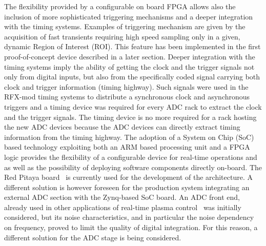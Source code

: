 The flexibility provided by a configurable on board FPGA allows also the inclusion of more sophisticated triggering mechanisms and a deeper integration with the timing systems. Examples of triggering mechanism are given by the acquisition of fast transients requiring high speed sampling only in a given, dynamic Region of Interest (ROI). This feature has been implemented in the first proof-of-concept device described in a later section. Deeper integration with the timing systems imply the ability of getting the clock and the trigger signals not only from digital inputs, but also from the specifically coded signal carrying both clock and trigger information (timing highway)\cite{dio4}. Such signals were used in the RFX-mod timing systems to distribute a synchronous clock and asynchronous triggers and a timing device was required for every ADC rack to extract the clock and the trigger signals. The timing device is no more required for a rack hosting the new ADC devices because the ADC devices can directly extract timing information from the timing highway.  
%
The adoption of a System on Chip (SoC) based technology exploiting both an ARM based processing unit and a FPGA logic provides the  flexibility of a configurable device for real-time operations and as well as the possibility of deploying software components directly on-board. The Red Pitaya board~\cite{redpitaya} is currently used for the development of the architecture. A different solution is however foreseen for the production system integrating an external ADC section with the Zynq-based SoC board. An ADC front end, already used in other applications of real-time plasma control~\cite{ATCA-MIMO-ISOL} was initially considered, but its noise characteristics, and in particular the noise dependency on frequency, proved to limit the quality of digital integration. For this reason, a different solution for the ADC stage is being considered.


